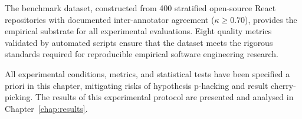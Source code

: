 The benchmark dataset, constructed from 400 stratified open-source React
repositories with documented inter-annotator agreement ($\kappa \geq 0.70$),
provides the empirical substrate for all experimental evaluations.  Eight
quality metrics validated by automated scripts ensure that the dataset
meets the rigorous standards required for reproducible empirical software
engineering research.

All experimental conditions, metrics, and statistical tests have been
specified a priori in this chapter, mitigating risks of hypothesis
p-hacking and result cherry-picking.  The results of this experimental
protocol are presented and analysed in Chapter~\ref{chap:results}.

%
%
%
%
%
%
%
%
%
%
%
%
%
%
%
%
%
